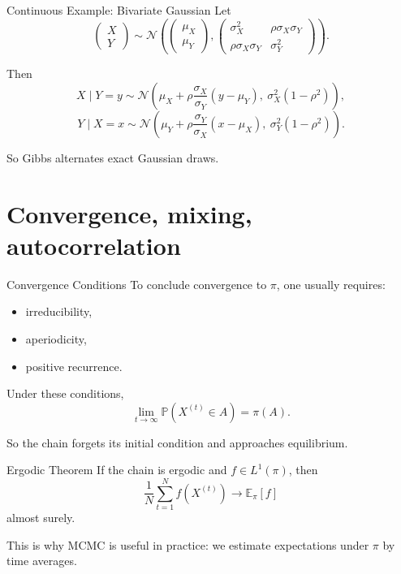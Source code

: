 \documentclass[aspectratio=169]{beamer}
\begin{document}
\begin{frame}{Continuous Example: Bivariate Gaussian}
Let
\[
\begin{pmatrix}X\\Y\end{pmatrix}
\sim\mathcal{N}\left(
\begin{pmatrix}\mu_X\\\mu_Y\end{pmatrix},
\begin{pmatrix}
\sigma_X^2 & \rho\sigma_X\sigma_Y\\
\rho\sigma_X\sigma_Y & \sigma_Y^2
\end{pmatrix}
\right).
\]

Then
\[
X\mid Y=y \sim
\mathcal{N}\left(
\mu_X+\rho\frac{\sigma_X}{\sigma_Y}(y-\mu_Y),
\ \sigma_X^2(1-\rho^2)
\right),
\]
\[
Y\mid X=x \sim
\mathcal{N}\left(
\mu_Y+\rho\frac{\sigma_Y}{\sigma_X}(x-\mu_X),
\ \sigma_Y^2(1-\rho^2)
\right).
\]

So Gibbs alternates exact Gaussian draws.
\end{frame}

\section{Convergence, mixing, autocorrelation}

\begin{frame}{Convergence Conditions}
To conclude convergence to \(\pi\), one usually requires:
\begin{itemize}
    \item irreducibility,
    \item aperiodicity,
    \item positive recurrence.
\end{itemize}

Under these conditions,
\[
\lim_{t\to\infty}\mathbb{P}(X^{(t)}\in A)=\pi(A).
\]

So the chain forgets its initial condition and approaches equilibrium.
\end{frame}

\begin{frame}{Ergodic Theorem}
If the chain is ergodic and \(f\in L^1(\pi)\), then
\[
\frac{1}{N}\sum_{t=1}^N f(X^{(t)})
\longrightarrow
\mathbb{E}_{\pi}[f]
\]
almost surely.

This is why MCMC is useful in practice: we estimate expectations under \(\pi\) by time averages.
\end{frame}
\end{document}
